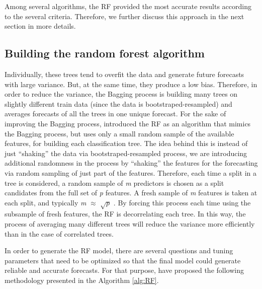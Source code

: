 \documentclass[preprint, 3p,
authoryear]{elsarticle} %
\begin{document}
Among several algorithms, the RF provided the most accurate results
according to the several criteria. Therefore, we further discuss this
approach in the next section in more details.

\hypertarget{building-the-random-forest-algorithm}{%
\subsection{Building the random forest
algorithm}\label{building-the-random-forest-algorithm}}

Individually, these trees tend to overfit the data and generate future
forecasts with large variance. But, at the same time, they produce a low
bias. Therefore, in order to reduce the variance, the Bagging process is
building many trees on slightly different train data (since the data is
bootstraped-resampled) and averages forecasts of all the trees in one
unique forecast. For the sake of improving the Bagging process,
\citet{breiman2001random} introduced the RF as an algorithm that mimics
the Bagging process, but uses only a small random sample of the
available features, for building each classification tree. The idea
behind this is instead of just ``shaking'' the data via
bootstraped-resampled process, we are introducing additional randomness
in the process by ``shaking'' the features for the forecasting via
random sampling of just part of the features. Therefore, each time a
split in a tree is considered, a random sample of \emph{m} predictors is
chosen as a split candidates from the full set of \emph{p} features. A
fresh sample of \emph{m} features is taken at each split, and typically
\emph{m} \(\approx\) \(\sqrt p\) \citep{friedman2001elements}. By
forcing this process each time using the subsample of fresh features,
the RF is decorrelating each tree. In this way, the process of averaging
many different trees will reduce the variance more efficiently than in
the case of correlated trees.

In order to generate the RF model, there are several questions and
tuning parameters that need to be optimized so that the final model
could generate reliable and accurate forecasts. For that purpose,
\citet{friedman2001elements} have proposed the following methodology
presented in the Algorithm \ref{alg:RF}.
\end{document}
